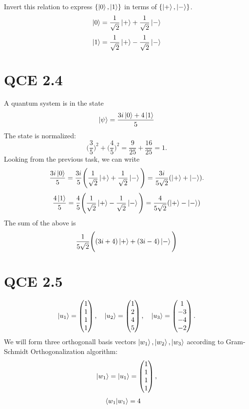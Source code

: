 \documentclass[10pt]{article}
\begin{document}
Invert this relation to express $\{ \ket{0}, \ket{1} \}$ in terms of $\{ \ket{+}, \ket{-} \}$.
\[
\ket{0} = \frac{1}{\sqrt{2}} \ket{+} + \frac{1}{\sqrt{2}} \ket{-}
\]
\[
\ket{1} = \frac{1}{\sqrt{2}} \ket{+} - \frac{1}{\sqrt{2}} \ket{-}
\]

\section*{QCE 2.4}
A quantum system is in the state
\[
\ket{\psi} = \frac{3i\ket{0} + 4\ket{1}}{5}
\]
The state is normalized: 
\[
\Bigg( \frac{3}{5} \Bigg)^2 + \Bigg( \frac{4}{5} \Bigg)^2 = \frac{9}{25} + \frac{16}{25} = 1.
\]
Looking from the previous task, we can write
\[
\frac{3i\ket{0}}{5} = \frac{3i}{5}\Bigg( \frac{1}{\sqrt{2}} \ket{+} + \frac{1}{\sqrt{2}} \ket{-} \Bigg) = \frac{3i}{5\sqrt{2}} (\ket{+} + \ket{-}).
\]
\[
\frac{4\ket{1}}{5} = \frac{4}{5} \Bigg( \frac{1}{\sqrt{2}} \ket{+} - \frac{1}{\sqrt{2}} \ket{-} \Bigg) = \frac{4}{5\sqrt{2}} (\ket{+} - \ket{-})
\]
The sum of the above is 
\[
\frac{1}{5\sqrt{2}} \Bigg( (3i + 4) \ket{+} + (3i - 4) \ket{-} \Bigg)
\]

\section*{QCE 2.5}
\[
\ket{u_1} = \begin{pmatrix}
1 \\
1 \\
1 \\
1 
\end{pmatrix}, \quad
\ket{u_2} = \begin{pmatrix}
1 \\
2 \\
4 \\
5 
\end{pmatrix}, \quad
\ket{u_3} = \begin{pmatrix}
1 \\
-3 \\
-4 \\
-2
\end{pmatrix}.
\]
We will form three orthogonall basis vectors $\ket{w_1}, \ket{w_2}, \ket{w_3}$ according to Gram-Schmidt Orthogonalization algorithm:
\[
\ket{w_1} = \ket{u_1} = \begin{pmatrix}
1 \\
1 \\
1 \\
1
\end{pmatrix},
\]
\begin{align*}
\braket{ w_1 | w_1 } &= 4
\end{align*}
\end{document}

